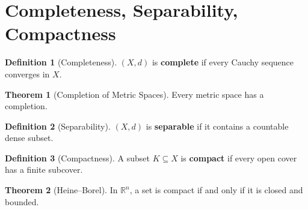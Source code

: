 \documentclass[12pt]{article}
\theoremstyle{definition} %
\newtheorem{theorem}{Theorem}
\newtheorem{definition}{Definition}
\theoremstyle{plain} %
\begin{document}
\section{Completeness, Separability, Compactness}

\begin{definition}[Completeness]
\((X,d)\) is \textbf{complete} if every Cauchy sequence converges in \(X\).
\end{definition}

\begin{theorem}[Completion of Metric Spaces]
Every metric space has a completion.
\end{theorem}

\begin{definition}[Separability]
\((X,d)\) is \textbf{separable} if it contains a countable dense subset.
\end{definition}

\begin{definition}[Compactness]
A subset \(K\subseteq X\) is \textbf{compact} if every open cover has a finite subcover.
\end{definition}

\begin{theorem}[Heine--Borel]
In \(\mathbb{R}^n\), a set is compact if and only if it is closed and bounded.
\end{theorem}
\end{document}
